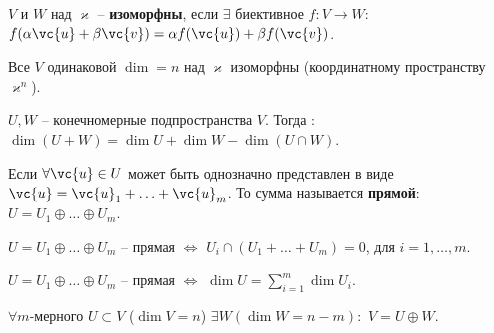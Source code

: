 \begin{to_def}
	$V$ и $W$ над $\varkappa$ -- \textbf{изоморфны}, если  $\exists$ биективное $f \colon V \to W:$ $f(\alpha \vc{u} + \beta \vc{v}) = \alpha f(\vc{u}) + \beta f(\vc{v})$.
\end{to_def}

\begin{to_thr}
	Все $V$ одинаковой $\dim = n$ над $\varkappa$ изоморфны (координатному пространству $\varkappa^n$).
\end{to_thr}

\begin{to_thr}
	$U, W$ -- конечномерные подпространства $V$. Тогда : $\dim(U + W) = \dim U + \dim W - \dim(U \cap W)$.
\end{to_thr}

\begin{to_def}
	Если $\forall \vc{u} \in U$ может быть однозначно представлен в виде $\vc{u} = \vc{u}_1 + \ldots + \vc{u}_m$. То сумма называется \textbf{прямой}: $U = U_1 \oplus \ldots \oplus U_m$.
\end{to_def}

\begin{to_thr}
	$U = U_1 \oplus \ldots \oplus U_m$ -- прямая $\Longleftrightarrow$ $U_i \cap (U_1 + \ldots + U_m) = 0$, для  $i=1, \ldots, m$.
\end{to_thr}

\begin{to_thr}
	$U = U_1 \oplus \ldots \oplus U_m$ -- прямая $\Longleftrightarrow$ $\dim U = \sum\limits_{ i=1 }^{ m } \dim U_i$.
\end{to_thr}

\begin{to_thr}
	$\forall m$-мерного $U \subset V$ ($\dim V = n$) $\exists W (\dim W = n-m):$ $V = U \oplus W$.
\end{to_thr}